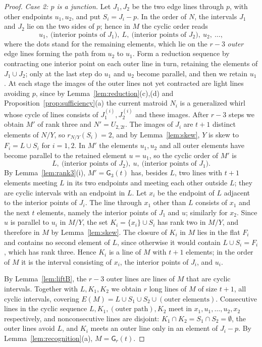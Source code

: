 \documentclass[11pt]{amsart}
\theoremstyle{definition}
\theoremstyle{remark}
\numberwithin{equation}{section}
\newcommand{\GW}{\mathsf{G}}
\begin{document}
\begin{proof}
\emph{Case 2: $p$ is a junction.} Let $J_1,J_2$ be the two edge lines through $p$, with other endpoints $u_1,u_2$, and put $S_i=J_i-p$. In the order of $N$, the intervals $J_1$ and $J_2$ lie on the two sides of $p$; hence in $M$ the cyclic order reads
\[
u_1,\ \text{(interior points of $J_1$)},\ L,\ \text{(interior points of $J_2$)},\ u_2,\ \dots,
\]
where the dots stand for the remaining elements, which lie on the $r-3$ \emph{outer} edge lines forming the path from $u_2$ to $u_1$. Form a reduction sequence by contracting one interior point on each outer line in turn, retaining the elements of $J_1\cup J_2$; only at the last step do $u_1$ and $u_2$ become parallel, and then we retain $u_1$. At each stage the images of the outer lines not yet contracted are light lines avoiding $p$, since by Lemma~\ref{lem:reduction}(c),(d) and Proposition~\ref{prop:sufficiency}(a) the current matroid $N_i$ is a generalized whirl whose cycle of lines consists of $J_1^{(i)},J_2^{(i)}$ and these images. After $r-3$ steps we obtain $M'$ of rank three and $N'=U_{2,2t}$. The images of $J_i$ are $t+1$ distinct elements of $N/Y$, so $r_{N/Y}(S_i)=2$, and by Lemma~\ref{lem:skew}, $Y$ is skew to $F_i=L\cup S_i$ for $i=1,2$. In $M'$ the elements $u_1,u_2$ and all outer elements have become parallel to the retained element $u=u_1$, so the cyclic order of $M'$ is
\[
L,\ \text{(interior points of $J_2$)},\ u,\ \text{(interior points of $J_1$)}.
\]
By Lemma~\ref{lem:rank3}(i), $M'=\GW_3(t)$ has, besides $L$, two lines with $t+1$ elements meeting $L$ in its two endpoints and meeting each other outside $L$; they are cyclic intervals with an endpoint in $L$. Let $x_i$ be the endpoint of $L$ adjacent to the interior points of $J_i$. The line through $x_1$ other than $L$ consists of $x_1$ and the next $t$ elements, namely the interior points of $J_1$ and $u$; similarly for $x_2$. Since $u$ is parallel to $u_i$ in $M/Y$, the set $K_i=\{x_i\}\cup S_i$ has rank two in $M/Y$, and therefore in $M$ by Lemma~\ref{lem:skew}. The closure of $K_i$ in $M$ lies in the flat $F_i$ and contains no second element of $L$, since otherwise it would contain $L\cup S_i=F_i$, which has rank three. Hence $K_i$ is a line of $M$ with $t+1$ elements; in the order of $M$ it is the interval consisting of $x_i$, the interior points of $J_i$, and $u_i$.

By Lemma~\ref{lem:liftB}, the $r-3$ outer lines are lines of $M$ that are cyclic intervals. Together with $L,K_1,K_2$ we obtain $r$ long lines of $M$ of size $t+1$, all cyclic intervals, covering $E(M)=L\cup S_1\cup S_2\cup(\text{outer elements})$. Consecutive lines in the cyclic sequence $L,K_1,(\text{outer path}),K_2$ meet in $x_1,u_1,\dots,u_2,x_2$ respectively, and nonconsecutive lines are disjoint: $K_1\cap K_2=S_1\cap S_2=\emptyset$, the outer lines avoid $L$, and $K_i$ meets an outer line only in an element of $J_i-p$. By Lemma~\ref{lem:recognition}(a), $M=\GW_r(t)$.
\end{proof}
\end{document}
